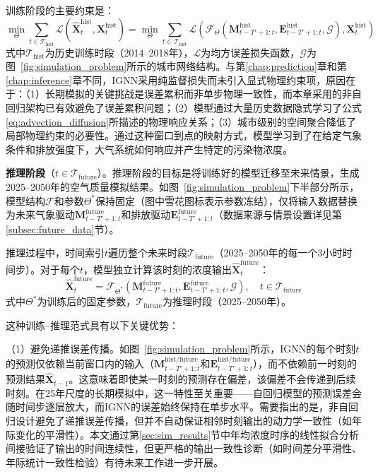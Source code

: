 训练阶段的主要约束是：
\begin{equation}
\min_{\Theta} \sum_{t \in \mathcal{T}_{\text{hist}}} \mathcal{L}\left(\hat{\mathbf{X}}^{\text{hist}}_t, \mathbf{X}^{\text{hist}}_t\right) = \min_{\Theta} \sum_{t \in \mathcal{T}_{\text{hist}}} \mathcal{L}\left(\mathcal{F}_\Theta\left(\mathbf{M}^{\text{hist}}_{t-T'+1:t}, \mathbf{E}^{\text{hist}}_{t-T'+1:t}, \mathcal{G}\right), \mathbf{X}^{\text{hist}}_t\right)
\label{eq:training_objective}
\end{equation}
\noindent 式中$\mathcal{T}_{\text{hist}}$为历史训练时段（2014--2018年），$\mathcal{L}$为均方误差损失函数，$\mathcal{G}$为图~\ref{fig:simulation_problem}所示的城市网络结构。与第\ref{chap:prediction}章和第\ref{chap:inference}章不同，IGNN采用纯监督损失而未引入显式物理约束项，原因在于：（1）长期模拟的关键挑战是误差累积而非单步物理一致性，而本章采用的非自回归架构已有效避免了误差累积问题；（2）模型通过大量历史数据隐式学习了公式\eqref{eq:advection_diffusion}所描述的物理响应关系；（3）城市级别的空间聚合降低了局部物理约束的必要性。通过这种窗口到点的映射方式，模型学习到了在给定气象条件和排放强度下，大气系统如何响应并产生特定的污染物浓度。

\textbf{推理阶段}（$t \in \mathcal{T}_{\text{future}}$）。推理阶段的目标是将训练好的模型迁移至未来情景，生成2025--2050年的空气质量模拟结果。如图~\ref{fig:simulation_problem}下半部分所示，模型结构$\mathcal{F}$和参数$\Theta^*$保持固定（图中雪花图标表示参数冻结），仅将输入数据替换为未来气象驱动$\mathbf{M}^{\text{future}}_{t-T'+1:t}$和排放驱动$\mathbf{E}^{\text{future}}_{t-T'+1:t}$（数据来源与情景设置详见第\ref{subsec:future_data}节）。

推理过程中，时间索引$t$遍历整个未来时段$\mathcal{T}_{\text{future}}$（2025--2050年的每一个3小时时间步）。对于每个$t$，模型独立计算该时刻的浓度输出$\hat{\mathbf{X}}^{\text{future}}_t$：
\begin{equation}
\hat{\mathbf{X}}^{\text{future}}_t = \mathcal{F}_{\Theta^*}\left(\mathbf{M}^{\text{future}}_{t-T'+1:t}, \mathbf{E}^{\text{future}}_{t-T'+1:t}, \mathcal{G}\right), \quad t \in \mathcal{T}_{\text{future}}
\label{eq:inference}
\end{equation}
\noindent 式中$\Theta^*$为训练后的固定参数，$\mathcal{T}_{\text{future}}$为推理时段（2025--2050年）。

这种训练--推理范式具有以下关键优势：

（1）避免递推误差传播。如图~\ref{fig:simulation_problem}所示，IGNN的每个时刻$t$的预测仅依赖当前窗口内的输入（$\mathbf{M}^{\text{hist/future}}_{t-T'+1:t}$和$\mathbf{E}^{\text{hist/future}}_{t-T'+1:t}$），而不依赖前一时刻的预测结果$\hat{\mathbf{X}}_{t-1}$。这意味着即使某一时刻的预测存在偏差，该偏差不会传递到后续时刻。在25年尺度的长期模拟中，这一特性至关重要——自回归模型的预测误差会随时间步逐层放大，而IGNN的误差始终保持在单步水平。需要指出的是，非自回归设计避免了递推误差传播，但并不自动保证相邻时刻输出的动力学一致性（如年际变化的平滑性）。本文通过第\ref{sec:sim_results}节中年均浓度时序的线性拟合分析间接验证了输出的时间连续性，但更严格的输出一致性诊断（如时间差分平滑性、年际统计一致性检验）有待未来工作进一步开展。

